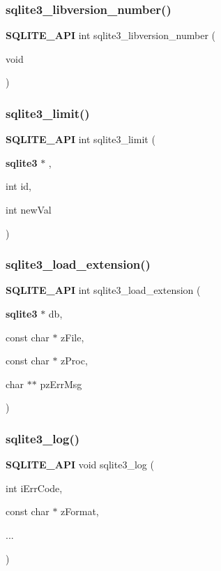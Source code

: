 \subsubsection{sqlite3\_libversion\_number()}
{\footnotesize\ttfamily \textbf{ S\+Q\+L\+I\+T\+E\+\_\+\+A\+PI} int sqlite3\+\_\+libversion\+\_\+number (\begin{DoxyParamCaption}\item[{void}]{ }\end{DoxyParamCaption})}

\mbox{\label{sqlite3_8h_a0d5285a0d90a8451494172b9ef79be7b}} 
\subsubsection{sqlite3\_limit()}
{\footnotesize\ttfamily \textbf{ S\+Q\+L\+I\+T\+E\+\_\+\+A\+PI} int sqlite3\+\_\+limit (\begin{DoxyParamCaption}\item[{\textbf{ sqlite3} $\ast$}]{,  }\item[{int}]{id,  }\item[{int}]{new\+Val }\end{DoxyParamCaption})}

\mbox{\label{sqlite3_8h_a9ddf80e7265851b2d79e85aa1f4087b2}} 
\subsubsection{sqlite3\_load\_extension()}
{\footnotesize\ttfamily \textbf{ S\+Q\+L\+I\+T\+E\+\_\+\+A\+PI} int sqlite3\+\_\+load\+\_\+extension (\begin{DoxyParamCaption}\item[{\textbf{ sqlite3} $\ast$}]{db,  }\item[{const char $\ast$}]{z\+File,  }\item[{const char $\ast$}]{z\+Proc,  }\item[{char $\ast$$\ast$}]{pz\+Err\+Msg }\end{DoxyParamCaption})}

\mbox{\label{sqlite3_8h_a298c9699bf9c143662c6b1fec4b2dc3b}} 
\subsubsection{sqlite3\_log()}
{\footnotesize\ttfamily \textbf{ S\+Q\+L\+I\+T\+E\+\_\+\+A\+PI} void sqlite3\+\_\+log (\begin{DoxyParamCaption}\item[{int}]{i\+Err\+Code,  }\item[{const char $\ast$}]{z\+Format,  }\item[{}]{... }\end{DoxyParamCaption})}


